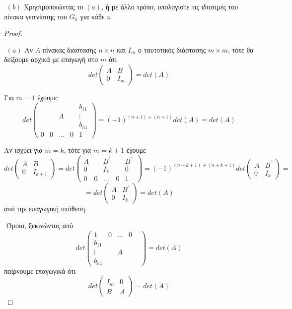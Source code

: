 \documentclass[oneside,a4paper]{article}
\begin{document}
$ $\newline
$(b)$ Χρησιμοποιώντας το $(a)$, ή με άλλο τρόπο, υπολογίστε τις ιδιοτιμές του πίνακα γειτνίασης του $G_n$ για κάθε $n$.

\begin{proof} $ $
	
	$ $\newline
	$(a)$ Αν $A$ πίνακας διάστασης $n\times n$ και $I_m$ ο ταυτοτικός διάστασης $m\times m$, τότε θα δείξουμε αρχικά με επαγωγή στο $m$ ότι 
	$$det \begin{pmatrix}
		A & B \\
		0 & I_m
	\end{pmatrix} = det(A)$$

	Για $m=1$ έχουμε:
	$$det \begin{pmatrix}
		& & & & b_{11} \\
		& & A& & \vdots \\
		 & & & & b_{n1} \\
		0 & 0 & \ldots & 0 & 1 
	\end{pmatrix} = (-1)^{(n+1) + (n+1)} det(A) = det(A)$$

	Αν ισχύει για $m=k$, τότε για $m=k+1$ έχουμε
	$$det \begin{pmatrix}
		A & B \\
		0 & I_{k+1}
	\end{pmatrix} =  det \begin{pmatrix}
		A & B^{\prime} & B^{\prime\prime} \\
		0 & I_{k} & 0 \\
		0 \quad 0 & \ldots \quad0 & 1
	\end{pmatrix} = (-1)^{(n+k+1) + (n+k+1)} det \begin{pmatrix}
		A & B^{\prime} \\
		0 & I_{k}
	\end{pmatrix} = $$
	$$ = det \begin{pmatrix}
		A & B^{\prime} \\
		0 & I_{k}
	\end{pmatrix} = det(A)$$
	από την επαγωγική υπόθεση.

	$ $\newline
	Όμοια, ξεκινώντας από 
	$$det \begin{pmatrix}
		1 & 0 & \ldots & 0\\
		b_{11} & & & &  \\
		\vdots & & A& &  \\
		b_{n1} & & & & 
	\end{pmatrix} = det(A)$$
	παίρνουμε επαγωγικά ότι
	$$det \begin{pmatrix}
		I_m & 0 \\
		B & A
	\end{pmatrix} = det(A)$$


\end{proof}
\end{document}
